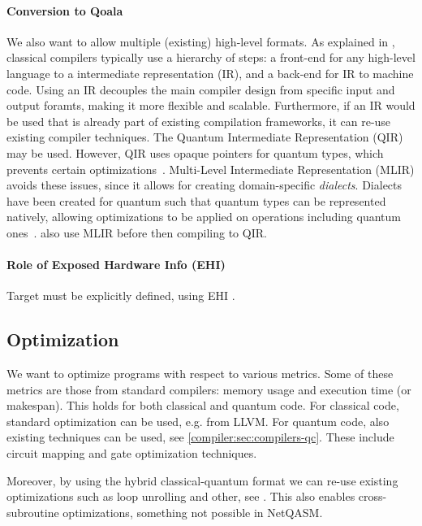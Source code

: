 \paragraph{Conversion to Qoala}
We also want to allow multiple (existing) high-level formats.
As explained in , classical compilers typically use a hierarchy of steps: a front-end for any high-level language to a intermediate representation (IR), and a back-end for IR to machine code.
Using an IR decouples the main compiler design from specific input and output foramts, making it more flexible and scalable.
Furthermore, if an IR would be used that is already part of existing compilation frameworks, it can re-use existing compiler techniques.
The Quantum Intermediate Representation (QIR)~\cite{haner_software_2018, geller_introducing_2020} may be used.
However, QIR uses opaque pointers for quantum types, which prevents certain optimizations~\cite{ittah_enabling_2022, peduri_qssa_2022}.
Multi-Level Intermediate Representation (MLIR) avoids these issues, since it allows for creating domain-specific \emph{dialects}.
Dialects have been created for quantum such that quantum types can be represented natively, allowing optimizations to be applied on operations including quantum ones~\cite{ittah_enabling_2022, peduri_qssa_2022}.
\cite{mccaskey_mlir_2021, nguyen_retargetable_2022} also use MLIR before then compiling to QIR.

\paragraph{Role of Exposed Hardware Info (EHI)}
Target must be explicitly defined, using EHI .


\subsection{Optimization}
We want to optimize programs with respect to various metrics.
Some of these metrics are those from standard compilers: memory usage and execution time (or makespan).
This holds for both classical and quantum code.
For classical code, standard optimization can be used, e.g. from LLVM.
For quantum code, also existing techniques can be used, see \cref{compiler:sec:compilers-qc}.
These include circuit mapping and gate optimization techniques.

Moreover, by using the hybrid classical-quantum format we can re-use existing optimizations such as loop unrolling and other, see \cite{mccaskey_mlir_2021, ittah_enabling_2022, nguyen_retargetable_2022, peduri_qssa_2022}.
This also enables cross-subroutine optimizations, something not possible in NetQASM.

